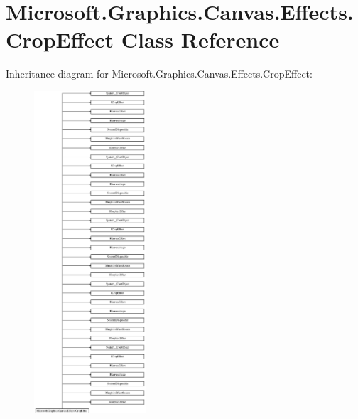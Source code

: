 \hypertarget{class_microsoft_1_1_graphics_1_1_canvas_1_1_effects_1_1_crop_effect}{}\section{Microsoft.\+Graphics.\+Canvas.\+Effects.\+Crop\+Effect Class Reference}
\label{class_microsoft_1_1_graphics_1_1_canvas_1_1_effects_1_1_crop_effect}
Inheritance diagram for Microsoft.\+Graphics.\+Canvas.\+Effects.\+Crop\+Effect\+:\begin{figure}[H]
\begin{center}
\leavevmode
\includegraphics[height=12.000000cm]{class_microsoft_1_1_graphics_1_1_canvas_1_1_effects_1_1_crop_effect}
\end{center}
\end{figure}
